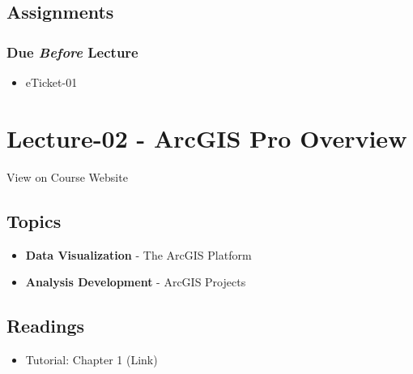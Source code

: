 \documentclass[
]{book}
\providecommand{\tightlist}{%
  \setlength{\itemsep}{0pt}\setlength{\parskip}{0pt}}
\begin{document}
\hypertarget{assignments-2}{%
\subsection*{Assignments}\label{assignments-2}}

\hypertarget{due-before-lecture}{%
\subsubsection*{\texorpdfstring{Due \emph{Before} Lecture}{Due Before Lecture}}\label{due-before-lecture}}

\begin{itemize}
\tightlist
\item
  eTicket-01
\end{itemize}

\hypertarget{lecture-02---arcgis-pro-overview}{%
\section*{Lecture-02 - ArcGIS Pro Overview}\label{lecture-02---arcgis-pro-overview}}

View on Course Website

\hypertarget{topics-2}{%
\subsection*{Topics}\label{topics-2}}

\begin{itemize}
\tightlist
\item
  \textbf{Data Visualization} - The ArcGIS Platform
\item
  \textbf{Analysis Development} - ArcGIS Projects
\end{itemize}

\hypertarget{readings-3}{%
\subsection*{Readings}\label{readings-3}}

\begin{itemize}
\tightlist
\item
  Tutorial: Chapter 1 (Link)
\end{itemize}
\end{document}
